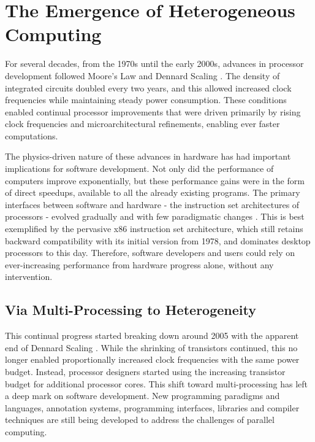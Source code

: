 \section{The Emergence of Heterogeneous Computing}

    For several decades, from the 1970s until the early 2000s, advances in
    processor development followed Moore's Law \citep{4785860} and
    Dennard Scaling \citep{1050511}.
    The density of integrated circuits doubled every two years,
    and this allowed increased clock frequencies while maintaining
    steady power consumption.
    These conditions enabled continual processor improvements that were driven
    primarily by rising clock frequencies and microarchitectural refinements,
    enabling ever faster computations.

    The physics-driven nature \citep{Hutcheson2018Moore} of these advances in
    hardware has had important implications for software development.
    Not only did the performance of computers improve exponentially, but these
    performance gains were in the form of direct speedups, available to all the
    already existing programs.
    The primary interfaces between software and hardware - the instruction set
    architectures of processors - evolved gradually and with few
    paradigmatic changes \citep{8310168}.
    This is best exemplified by the pervasive x86 instruction set architecture,
    which still retains backward compatibility with its initial version from
    1978, and dominates desktop processors to this day.
    Therefore, software developers and users could rely on ever-increasing
    performance from hardware progress alone, without any intervention.

\subsection{Via Multi-Processing to Heterogeneity}

    This continual progress started breaking down around 2005 with the apparent
    end of Dennard Scaling \citep{6307773}.
    While the shrinking of transistors continued, this no longer enabled
    proportionally increased clock frequencies with the same power budget.
    Instead, processor designers started using the increasing transistor
    budget for additional processor cores.
    This shift toward multi-processing has left a deep mark on software
    development.
    New programming paradigms and languages, annotation systems, programming
    interfaces, libraries and compiler techniques are still being developed to
    address the challenges of parallel computing.

